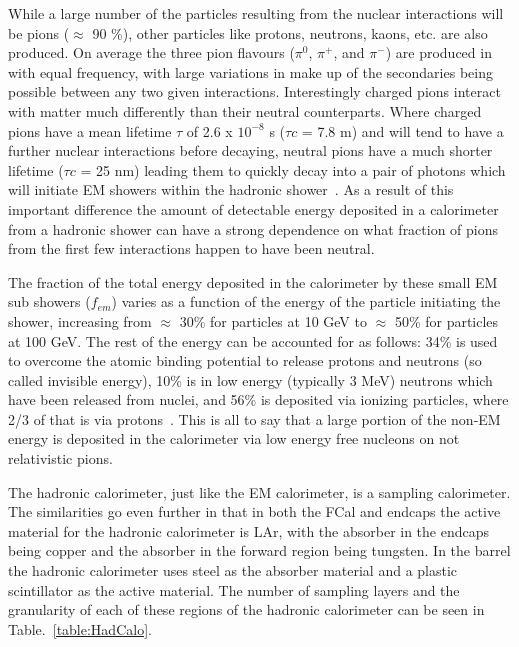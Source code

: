 While a large number of the particles resulting from the nuclear interactions will be pions ($\approx$ 90 \%), other particles like protons, neutrons, kaons, etc. are also produced.  
On average the three pion flavours ($\pi^0$, $\pi^{+}$, and $\pi^{-}$) are produced in with equal frequency, with large variations in make up of the secondaries being possible between any two given interactions.  
Interestingly charged pions interact with matter much differently than their neutral counterparts.  
Where charged pions have a mean lifetime $\tau$ of 2.6 x $10^{-8}$ s ($\tau c$ = 7.8 m) and will tend to have a further nuclear interactions before decaying, neutral pions have a much shorter lifetime ($\tau c$ = 25 nm) leading them to quickly decay into a pair of photons which will initiate EM showers within the hadronic shower~\cite{PDG}.  
As a result of this important difference the amount of detectable energy deposited in a calorimeter from a hadronic shower can have a strong dependence on what fraction of pions from the first few interactions happen to have been neutral.  

The fraction of the total energy deposited in the calorimeter by these small EM sub showers ($f_{em}$) varies as a function of the energy of the particle initiating the shower, increasing from $\approx$ 30\% for particles at 10 GeV to $\approx$ 50\% for particles at 100 GeV.  
The rest of the energy can be accounted for as follows: 34\% is used to overcome the atomic binding potential to release protons and neutrons (so called invisible energy), 10\% is in low energy (typically 3 MeV) neutrons which have been released from nuclei, and 56\% is deposited via ionizing particles, where 2/3 of that is via protons~\cite{Wigmans2008}.  
This is all to say that a large portion of the non-EM energy is deposited in the calorimeter via low energy free nucleons on not relativistic pions.  

The hadronic calorimeter, just like the EM calorimeter, is a sampling calorimeter.  
The similarities go even further in that in both the FCal and endcaps the active material for the hadronic calorimeter is LAr, with the absorber in the endcaps being copper and the absorber in the forward region being tungsten.  
In the barrel the hadronic calorimeter uses steel as the absorber material and a plastic scintillator as the active material.  
The number of sampling layers and the granularity of each of these regions of the hadronic calorimeter can be seen in Table.~\ref{table:HadCalo}. 

